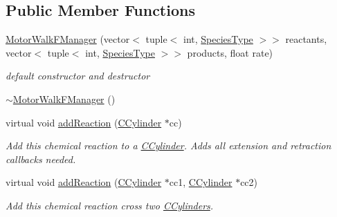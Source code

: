 \subsection*{Public Member Functions}
\begin{DoxyCompactItemize}
\item 
\hyperlink{classMotorWalkFManager_a9cd673efbc3ed580f4449e57ac5fae46}{Motor\+Walk\+F\+Manager} (vector$<$ tuple$<$ int, \hyperlink{Species_8h_a50651af47c56ea0e27235468d23542cf}{Species\+Type} $>$$>$ reactants, vector$<$ tuple$<$ int, \hyperlink{Species_8h_a50651af47c56ea0e27235468d23542cf}{Species\+Type} $>$$>$ products, float rate)
\begin{DoxyCompactList}\small\item\em default constructor and destructor \end{DoxyCompactList}\item 
\hyperlink{classMotorWalkFManager_a2a5f6d1af372cc1cff2527bd34f9eecd}{$\sim$\+Motor\+Walk\+F\+Manager} ()
\item 
virtual void \hyperlink{classMotorWalkFManager_a8974dbb104f327cf07b25415f74928db}{add\+Reaction} (\hyperlink{classCCylinder}{C\+Cylinder} $\ast$cc)
\begin{DoxyCompactList}\small\item\em Add this chemical reaction to a \hyperlink{classCCylinder}{C\+Cylinder}. Adds all extension and retraction callbacks needed. \end{DoxyCompactList}\item 
virtual void \hyperlink{classMotorWalkFManager_a7cb219c170555e7716f331e05e45aded}{add\+Reaction} (\hyperlink{classCCylinder}{C\+Cylinder} $\ast$cc1, \hyperlink{classCCylinder}{C\+Cylinder} $\ast$cc2)
\begin{DoxyCompactList}\small\item\em Add this chemical reaction cross two \hyperlink{classCCylinder}{C\+Cylinders}. \end{DoxyCompactList}\end{DoxyCompactItemize}
